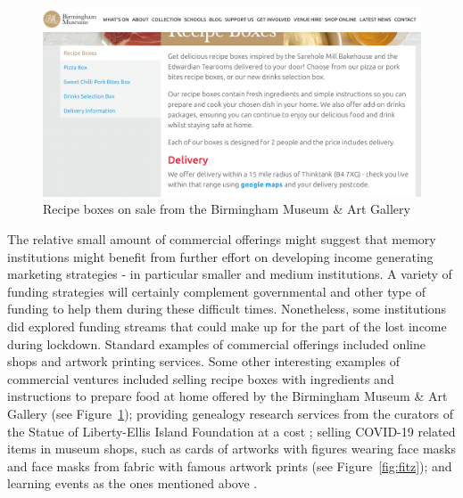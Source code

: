 \documentclass{egpubl}
\begin{document}
\begin{figure}[h]
  \centering
  \includegraphics[width=\linewidth]{images/recipebox.png}
  \caption{\label{fig:recipe}
            Recipe boxes on sale from the Birmingham Museum \& Art Gallery}
\end{figure}

The relative small amount of commercial offerings might suggest that memory institutions might benefit from further effort on developing income generating marketing strategies - in particular smaller and medium institutions. A variety of funding strategies will certainly complement governmental and other type of funding to help them during these difficult times. Nonetheless, some institutions did explored funding streams that could make up for the part of the lost income during lockdown. Standard examples of commercial offerings included online shops and artwork printing services. Some other interesting examples of commercial ventures included selling recipe boxes with ingredients and instructions to prepare food at home offered by the Birmingham Museum \& Art Gallery \cite{BirminghamMuseumArtGallery} (see Figure~\ref{fig:recipe}); providing genealogy research services from the curators of the Statue of Liberty-Ellis Island Foundation at a cost \cite{StatueofLiberty-EllisIslandFoundation2020}; selling COVID-19 related items in museum shops, such as cards of artworks with figures wearing face masks and face masks from fabric with famous artwork prints \cite{DetroitInstituteofArts2020,FitzwilliamMuseum2020} (see Figure~\ref{fig:fitz}); and learning events as the ones mentioned above \cite{Fieldmuseum,CaliforniaScienCenter2020}. 
\end{document}
